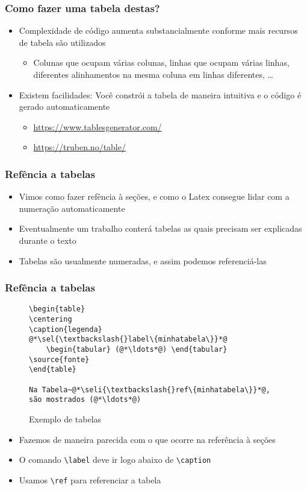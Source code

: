\begin{frame}[fragile] \frametitle{Como fazer uma tabela destas?}
\begin{itemize}
	\item Complexidade de código aumenta substancialmente conforme mais recursos de tabela são utilizados
	\begin{itemize}
		\item Colunas que ocupam várias colunas, linhas que ocupam várias linhas, diferentes alinhamentos na mesma coluna em linhas diferentes, \ldots
	\end{itemize}
	\item Existem facilidades: Você constrói a tabela de maneira intuitiva e o código é gerado automaticamente
	\begin{itemize}
		\item \url{https://www.tablesgenerator.com/}
		\item \url{https://truben.no/table/}
	\end{itemize}
\end{itemize}
\end{frame}

\begin{frame}[fragile] \frametitle{Refência a tabelas}

\begin{itemize}
	\item Vimos como fazer refência à seções, e como o Latex consegue lidar com a numeração automaticamente
	\item Eventualmente um trabalho conterá tabelas as quais precisam ser explicadas durante o texto
	\item Tabelas são usualmente numeradas, e assim podemos referenciá-las
\end{itemize}

\end{frame}

\begin{frame}[fragile,label={slide:referenciatabela}] \frametitle{Refência a tabelas}
\begin{figure}[!t]
\caption{Exemplo de tabelas}
\begin{lstlisting}
\begin{table}
\centering
\caption{legenda}
@*\sel{\textbackslash{}label\{minhatabela\}}*@
	\begin{tabular} (@*\ldots*@) \end{tabular}
\source{fonte}
\end{table}

Na Tabela~@*\seli{\textbackslash{}ref\{minhatabela\}}*@, são mostrados (@*\ldots*@)
\end{lstlisting}
\ownsrc
\end{figure}

\begin{itemize}
	\item Fazemos de maneira parecida com o que ocorre na referência à seções
	\item O comando \texttt{\textbackslash{}label} deve ir logo abaixo de \texttt{\textbackslash{}caption}
	\item Usamos \texttt{\textbackslash{}ref} para referenciar a tabela
\end{itemize}

\end{frame}